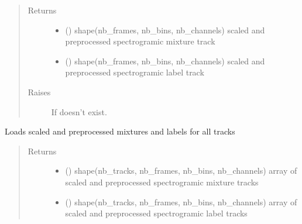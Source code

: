 \documentclass[letterpaper,10pt,english]{sphinxmanual}
\begin{document}
\begin{fulllineitems}
\begin{fulllineitems}
\begin{quote}
\begin{description}
\item[{Returns}] \leavevmode
\begin{itemize}
\item {} 
 () \textendash{} shape(nb\_frames, nb\_bins, nb\_channels)
scaled and preprocessed spectrogramic mixture track

\item {} 
 () \textendash{} shape(nb\_frames, nb\_bins, nb\_channels)
scaled and preprocessed spectrogramic label track

\end{itemize}


\item[{Raises}] \leavevmode
{} \textendash{} If  doesn’t exist.

\end{description}\end{quote}

\end{fulllineitems}


\begin{fulllineitems}
\label{\detokenize{docs/source/dataset:dataset.Dataset.load_all_tracks}}
Loads scaled and preprocessed mixtures and labels for all tracks
\begin{quote}\begin{description}
\item[{Returns}] \leavevmode
\begin{itemize}
\item {} 
 () \textendash{} shape(nb\_tracks, nb\_frames, nb\_bins, nb\_channels)
array of scaled and preprocessed spectrogramic mixture tracks

\item {} 
 () \textendash{} shape(nb\_tracks, nb\_frames, nb\_bins, nb\_channels)
array of scaled and preprocessed spectrogramic label tracks

\end{itemize}


\end{description}\end{quote}


\end{fulllineitems}
\end{fulllineitems}
\end{document}
